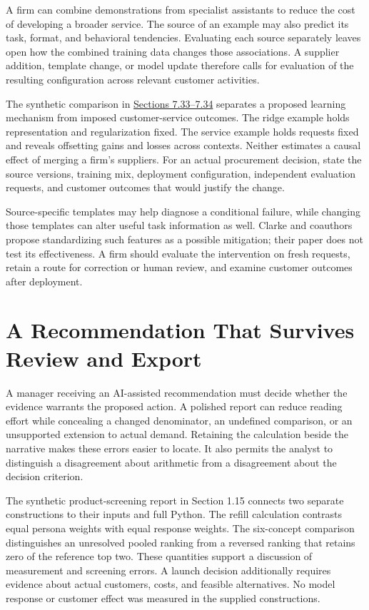 \noindent \noindent A firm can combine demonstrations from specialist assistants
to reduce the cost of developing a broader service. The source of an
example may also predict its task, format, and behavioral tendencies.
Evaluating each source separately leaves open how the combined training
data changes those associations. A supplier addition, template change,
or model update therefore calls for evaluation of the resulting
configuration across relevant customer activities.

The synthetic comparison in
\href{M07_Prediction_and_Machine_Learning.md}{Sections 7.33--7.34}
separates a proposed learning mechanism from imposed customer-service
outcomes. The ridge example holds representation and regularization
fixed. The service example holds requests fixed and reveals offsetting
gains and losses across contexts. Neither estimates a causal effect of
merging a firm's suppliers. For an actual procurement decision, state
the source versions, training mix, deployment configuration, independent
evaluation requests, and customer outcomes that would justify the
change.

Source-specific templates may help diagnose a conditional failure, while
changing those templates can alter useful task information as well.
Clarke and coauthors propose standardizing such features as a possible
mitigation; their paper does not test its effectiveness. A firm should
evaluate the intervention on fresh requests, retain a route for
correction or human review, and examine customer outcomes after
deployment.

\hypertarget{M08-a-recommendation-that-survives-review-and-export}{%
\section{A Recommendation That Survives Review and
Export}\label{M08-a-recommendation-that-survives-review-and-export}}

\noindent \noindent A manager receiving an AI-assisted recommendation must decide
whether the evidence warrants the proposed action. A polished report can
reduce reading effort while concealing a changed denominator, an
undefined comparison, or an unsupported extension to actual demand.
Retaining the calculation beside the narrative makes these errors easier
to locate. It also permits the analyst to distinguish a disagreement
about arithmetic from a disagreement about the decision criterion.

The synthetic product-screening report in Section 1.15 connects two
separate constructions to their inputs and full Python. The refill
calculation contrasts equal persona weights with equal response weights.
The six-concept comparison distinguishes an unresolved pooled ranking
from a reversed ranking that retains zero of the reference top two.
These quantities support a discussion of measurement and screening
errors. A launch decision additionally requires evidence about actual
customers, costs, and feasible alternatives. No model response or
customer effect was measured in the supplied constructions.

